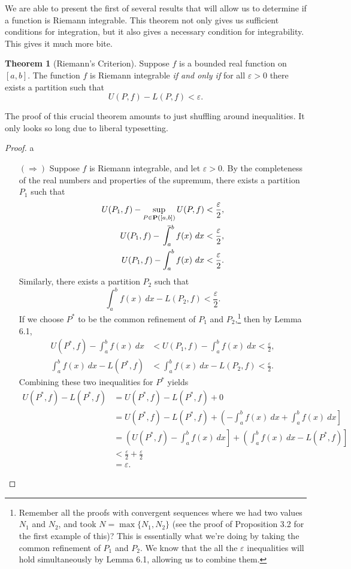 \documentclass{article}
\def\upint{\mathchoice%
	{\mkern13mu\overline{\vphantom{\intop}\mkern7mu}\mkern-20mu}%
	{\mkern7mu\overline{\vphantom{\intop}\mkern7mu}\mkern-14mu}%
	{\mkern7mu\overline{\vphantom{\intop}\mkern7mu}\mkern-14mu}%
	{\mkern7mu\overline{\vphantom{\intop}\mkern7mu}\mkern-14mu}%
	\int}
\theoremstyle{definition}
\newtheorem{theorem}{Theorem}[section]
\begin{document}
	We are able to present the first of several results that will allow us to determine if a function is Riemann integrable. This theorem not only gives us sufficient conditions for integration, but it also gives a necessary condition for integrability. This gives it much more bite. 
	\begin{theorem}[Riemann's Criterion]
		Suppose $ f $ is a bounded real function on $ [a,b] $. The function $ f $ is Riemann integrable \textit{if and only if} for all $ \varepsilon>0 $ there exists a partition such that $$ U(P,f)-L(P,f)<\varepsilon.$$
	\end{theorem} The proof of this crucial theorem amounts to just shuffling around inequalities. It only looks so long due to liberal typesetting.  
	\begin{proof}{\color{white}a}
		\begin{enumerate}
			\item [$ (\Longrightarrow) $] Suppose $ f $ is Riemann integrable, and let $ \varepsilon>0 $. By the completeness of the real numbers and properties of the supremum, there exists a partition $ P_1 $ such that \begin{align*}
				U(P_1,f)-\sup\limits_{P\in\textbf{P}([a,b])}U(P,f)&<\frac{\varepsilon}{2},\\
				U(P_1,f)-\upint_a^b f(x)\ dx&<\frac{\varepsilon}{2},\\
				U(P_1,f)-\int_a^b f(x)\ dx&<\frac{\varepsilon}{2}.
			\end{align*} 
			Similarly, there exists a partition $ P_2 $ such that $$\int_a^bf(x)\ dx-L(P_2,f)<\frac{\varepsilon}{2}. $$ If we choose $ P^* $ to be the common refinement of $ P_1 $ and $ P_2 $,\footnote{Remember all the proofs with convergent sequences where we had two values $ N_1 $ and $ N_2 $, and took $ N=\max\{N_1,N_2\} $ (see the proof of Proposition 3.2 for the first example of this)? This is essentially what we're doing by taking the common refinement of $ P_1 $ and $ P_2 $. We know that the all the $ \varepsilon $ inequalities will hold simultaneously by Lemma 6.1, allowing us to combine them.} then by Lemma 6.1, \begin{align*}
				U(P^*,f)-\int_a^b f(x)\ dx&<U(P_1,f)-\int_a^b f(x)\ dx<\frac{\varepsilon}{2},\\\int_a^bf(x)\ dx-L(P^*,f)&<\int_a^bf(x)\ dx-L(P_2,f)<\frac{\varepsilon}{2}.
			\end{align*}
			Combining these two inequalities for $ P^* $ yields
			\begin{align*}
				U(P^*,f)-L(P^*,f)&=U(P^*,f)-L(P^*,f)+0\\&=U(P^*,f)-L(P^*,f)+\left(-\int_a^b f(x)\ dx+\int_a^bf(x)\ dx\right]\\&=\left(U(P^*,f)-\int_a^b f(x)\ dx\right]+\left(\int_a^bf(x)\ dx-L(P^*,f)\right]\\&<\frac{\varepsilon}{2}+\frac{\varepsilon}{2}\\&=\varepsilon.

\end{align*}
\end{enumerate}
\end{proof}
\end{document}

